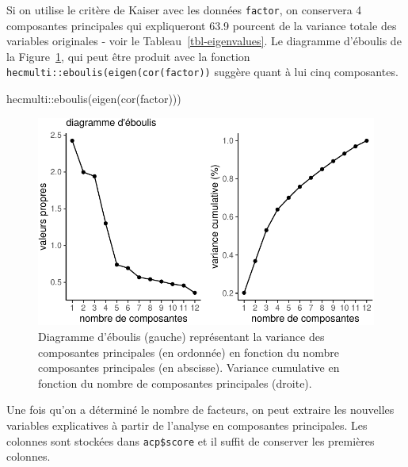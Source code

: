 \documentclass[
  11pt,
  letterpaper,
]{scrbook}
\newenvironment{Shaded}{\begin{snugshade}}{\end{snugshade}}
\newcommand{\FunctionTok}[1]{\textcolor[rgb]{0.28,0.35,0.67}{#1}}
\newcommand{\NormalTok}[1]{\textcolor[rgb]{0.00,0.23,0.31}{#1}}
\newcommand{\SpecialCharTok}[1]{\textcolor[rgb]{0.37,0.37,0.37}{#1}}
\theoremstyle{definition}
\theoremstyle{remark}
\begin{document}
Si on utilise le critère de Kaiser avec les données \texttt{factor}, on
conservera 4 composantes principales qui expliqueront 63.9 pourcent de
la variance totale des variables originales - voir le
Tableau~\ref{tbl-eigenvalues}. Le diagramme d'éboulis de la
Figure~\ref{fig-screeplot}, qui peut être produit avec la fonction
\texttt{hecmulti::eboulis(eigen(cor(factor))} suggère quant à lui cinq
composantes.

\begin{Shaded}
\begin{Highlighting}[]
\NormalTok{hecmulti}\SpecialCharTok{::}\FunctionTok{eboulis}\NormalTok{(}\FunctionTok{eigen}\NormalTok{(}\FunctionTok{cor}\NormalTok{(factor)))}
\end{Highlighting}
\end{Shaded}

\begin{figure}[ht!]

{\centering \includegraphics{./02-analysefactorielle_files/figure-pdf/fig-screeplot-1.pdf}

}

\caption{\label{fig-screeplot}Diagramme d'éboulis (gauche) représentant
la variance des composantes principales (en ordonnée) en fonction du
nombre composantes principales (en abscisse). Variance cumulative en
fonction du nombre de composantes principales (droite).}

\end{figure}

Une fois qu'on a déterminé le nombre de facteurs, on peut extraire les
nouvelles variables explicatives à partir de l'analyse en composantes
principales. Les colonnes sont stockées dans \texttt{acp\$score} et il
suffit de conserver les premières colonnes.
\end{document}
